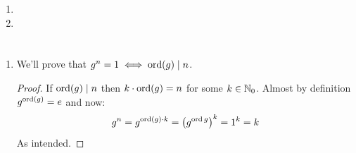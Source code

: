 \documentclass[a4paper]{article}
\begin{document}
\begin{enumerate}
\begin{proof}
			We already know $\gGL_2(\R)$ multiplication satisfies the conditions for group multiplication, so $\gSL_2(\Z)$ must form a subgroup of $\gGL_2(\R)$. 
		\end{proof}
		\item 
		\item 
	\end{enumerate}
	
	\section{}
	\begin{enumerate}
		\item We'll prove that $g^{n} = 1 \iff \operatorname{ord}(g) \mid n$. \begin{proof}
			If $\operatorname{ord} (g) \mid n$ then $k \cdot \operatorname{ord}(g) = n$ for some $k \in \mathbb{N}_0$. Almost by definition $g^{\operatorname{ord}(g)} = e$ and now:
			\[ g^{n} = g^{\operatorname{ord} (g)\cdot k} = \left ( g^{\operatorname{ord} g} \right )^{k} = 1^{k} = k \] 
			As intended. 
			

\end{proof}
\end{enumerate}
\end{document}
